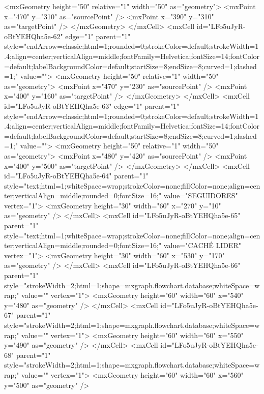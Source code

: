           <mxGeometry height="50" relative="1" width="50" as="geometry">
            <mxPoint x="470" y="310" as="sourcePoint" />
            <mxPoint x="390" y="310" as="targetPoint" />
          </mxGeometry>
        </mxCell>
        <mxCell id="LFo5uJyR-oBtYEHQha5e-62" edge="1" parent="1" style="endArrow=classic;html=1;rounded=0;strokeColor=default;strokeWidth=1.4;align=center;verticalAlign=middle;fontFamily=Helvetica;fontSize=14;fontColor=default;labelBackgroundColor=default;startSize=8;endSize=8;curved=1;dashed=1;" value="">
          <mxGeometry height="50" relative="1" width="50" as="geometry">
            <mxPoint x="470" y="230" as="sourcePoint" />
            <mxPoint x="400" y="160" as="targetPoint" />
          </mxGeometry>
        </mxCell>
        <mxCell id="LFo5uJyR-oBtYEHQha5e-63" edge="1" parent="1" style="endArrow=classic;html=1;rounded=0;strokeColor=default;strokeWidth=1.4;align=center;verticalAlign=middle;fontFamily=Helvetica;fontSize=14;fontColor=default;labelBackgroundColor=default;startSize=8;endSize=8;curved=1;dashed=1;" value="">
          <mxGeometry height="50" relative="1" width="50" as="geometry">
            <mxPoint x="480" y="420" as="sourcePoint" />
            <mxPoint x="400" y="500" as="targetPoint" />
          </mxGeometry>
        </mxCell>
        <mxCell id="LFo5uJyR-oBtYEHQha5e-64" parent="1" style="text;html=1;whiteSpace=wrap;strokeColor=none;fillColor=none;align=center;verticalAlign=middle;rounded=0;fontSize=16;" value="SEGUIDORES" vertex="1">
          <mxGeometry height="30" width="60" x="270" y="10" as="geometry" />
        </mxCell>
        <mxCell id="LFo5uJyR-oBtYEHQha5e-65" parent="1" style="text;html=1;whiteSpace=wrap;strokeColor=none;fillColor=none;align=center;verticalAlign=middle;rounded=0;fontSize=16;" value="CACHÉ LIDER" vertex="1">
          <mxGeometry height="30" width="60" x="530" y="170" as="geometry" />
        </mxCell>
        <mxCell id="LFo5uJyR-oBtYEHQha5e-66" parent="1" style="strokeWidth=2;html=1;shape=mxgraph.flowchart.database;whiteSpace=wrap;" value="" vertex="1">
          <mxGeometry height="60" width="60" x="540" y="480" as="geometry" />
        </mxCell>
        <mxCell id="LFo5uJyR-oBtYEHQha5e-67" parent="1" style="strokeWidth=2;html=1;shape=mxgraph.flowchart.database;whiteSpace=wrap;" value="" vertex="1">
          <mxGeometry height="60" width="60" x="550" y="490" as="geometry" />
        </mxCell>
        <mxCell id="LFo5uJyR-oBtYEHQha5e-68" parent="1" style="strokeWidth=2;html=1;shape=mxgraph.flowchart.database;whiteSpace=wrap;" value="" vertex="1">
          <mxGeometry height="60" width="60" x="560" y="500" as="geometry" />
